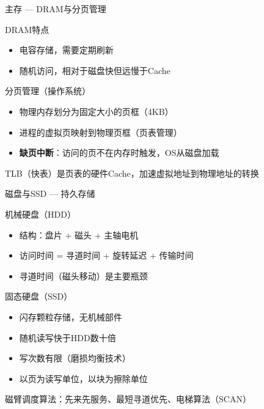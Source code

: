 \documentclass[10pt, aspectratio=169]{beamer}
\begin{document}
\begin{frame}{主存 --- DRAM与分页管理}
    \begin{block}{DRAM特点}
        \begin{itemize}
            \item 电容存储，需要定期刷新
            \item 随机访问，相对于磁盘快但远慢于Cache
        \end{itemize}
    \end{block}
    \begin{block}{分页管理（操作系统）}
        \begin{itemize}
            \item 物理内存划分为固定大小的页框（4KB）
            \item 进程的虚拟页映射到物理页框（页表管理）
            \item \textbf{缺页中断}：访问的页不在内存时触发，OS从磁盘加载
        \end{itemize}
    \end{block}
    \vspace{0.3em}
    \alert{TLB（快表）是页表的硬件Cache，加速虚拟地址到物理地址的转换}
\end{frame}

\begin{frame}{磁盘与SSD --- 持久存储}
    \begin{block}{机械硬盘（HDD）}
        \begin{itemize}
            \item 结构：盘片 + 磁头 + 主轴电机
            \item 访问时间 = 寻道时间 + 旋转延迟 + 传输时间
            \item 寻道时间（磁头移动）是主要瓶颈
        \end{itemize}
    \end{block}
    \begin{block}{固态硬盘（SSD）}
        \begin{itemize}
            \item 闪存颗粒存储，无机械部件
            \item 随机读写快于HDD数十倍
            \item 写次数有限（磨损均衡技术）
            \item 以页为读写单位，以块为擦除单位
        \end{itemize}
    \end{block}
    \vspace{0.3em}
    \alert{磁臂调度算法：先来先服务、最短寻道优先、电梯算法（SCAN）}
\end{frame}
\end{document}
